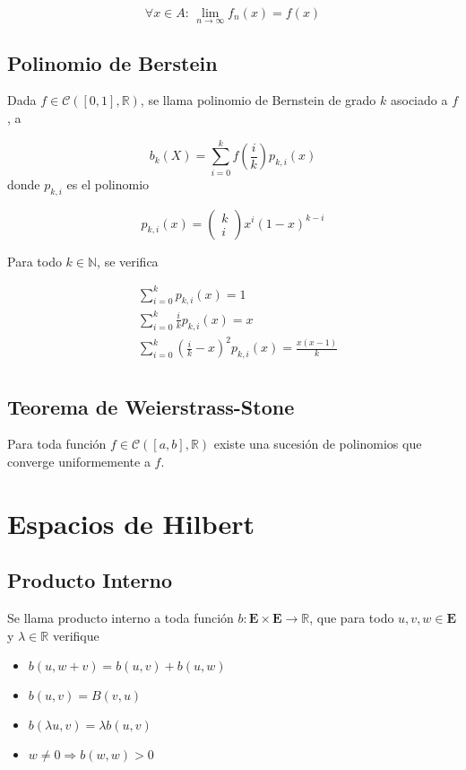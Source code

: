 \[\forall x\in A:\,\lim_{n\to\infty}f_n(x)=f(x)\]

\subsection{Polinomio de Berstein}

Dada $f\in\mathcal{C}([0,1],\mathbb{R})$, se llama polinomio de Bernstein de grado $k$ asociado a $f$, a

\[b_k(X) = \sum^k_{i=0}f\left(\frac{i}{k}\right)p_{k,i}(x)\]
\bigbreak
donde $p_{k,i}$ es el polinomio

\[p_{k,i}(x)=\begin{pmatrix}k\\i\end{pmatrix}x^i(1-x)^{k-i}\]
\bigbreak

Para todo $k\in\mathbb{N}$, se verifica

\begin{equation}
\begin{split}
    &\sum^k_{i=0}p_{k,i}(x)=1\\
    &\sum^k_{i=0}\frac{i}{k}p_{k,i}(x)=x\\
    &\sum^k_{i=0}(\frac{i}{k}-x)^2p_{k,i}(x)=\frac{x(x-1)}{k}\\
\end{split}
\nonumber
\end{equation}

\subsection{Teorema de Weierstrass-Stone}
\label{T:Weierstrass-Stone}
Para toda función $f\in\mathcal{C}([a,b],\mathbb{R})$ existe una sucesión de polinomios que converge uniformemente a $f$.

\section{Espacios de Hilbert}

\subsection{Producto Interno}

Se llama producto interno a toda función $b:\mathbf{E}\times\mathbf{E}\to\mathbb{R}$, que para todo $u,v,w\in\mathbf{E}$ y $\lambda\in\mathbb{R}$ verifique

\begin{itemize}
    \item $b(u,w+v)=b(u,v)+b(u,w)$
    \item $b(u,v)=B(v,u)$
    \item $b(\lambda u,v)=\lambda b(u,v)$
    \item $w\neq 0\Rightarrow b(w,w)>0$
\end{itemize}

